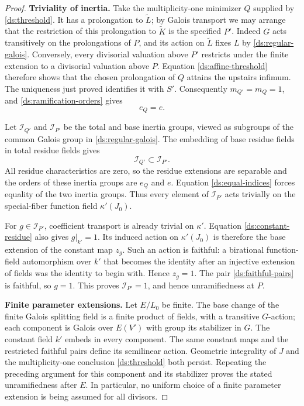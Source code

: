\begin{proof}
\smallskip\noindent\textbf{Triviality of inertia.}\enspace
Take the multiplicity-one minimizer $Q$ supplied by
\eqref{ds:threshold}.  It has a prolongation to $\widetilde L$;
by Galois transport we may arrange that the restriction of this
prolongation to $\widetilde K$ is the specified $P'$.  Indeed $G$
acts transitively on the prolongations of $P$, and its action on
$\widetilde L$ fixes $L$ by \eqref{ds:regular-galois}.
Conversely, every divisorial valuation above $P'$ restricts under
the finite extension to a divisorial valuation above $P$.
Equation \eqref{ds:affine-threshold} therefore shows that the
chosen prolongation of $Q$ attains the upstairs infimum.  The
uniqueness just proved identifies it with $S'$.  Consequently
$m_{Q'}=m_Q=1$, and \eqref{ds:ramification-orders} gives
\begin{equation}
 e_Q=e.
 \label{ds:equal-indices}
\end{equation}

Let $\mathcal I_{Q'}$ and $\mathcal I_{P'}$ be the total and base
inertia groups, viewed as subgroups of the common Galois group in
\eqref{ds:regular-galois}.  The embedding of base residue fields
in total residue fields gives
\[
 \mathcal I_{Q'}\subset\mathcal I_{P'}.
\]
All residue characteristics are zero, so the residue extensions
are separable and the orders of these inertia groups are $e_Q$
and $e$.  Equation \eqref{ds:equal-indices} forces equality of the
two inertia groups.  Thus every element of $\mathcal I_{P'}$ acts
trivially on the special-fiber function field $\kappa'(J_0)$.

For $g\in\mathcal I_{P'}$, coefficient transport is already
trivial on $\kappa'$.  Equation \eqref{ds:constant-residue} also
gives $g|_{k'}=1$.  Its induced action on $\kappa'(J_0)$ is
therefore the base extension of the constant map $z_g$.  Such an
action is faithful: a birational function-field automorphism over
$k'$ that becomes the identity after an injective extension of
fields was the identity to begin with.  Hence $z_g=1$.
The pair \eqref{ds:faithful-pairs} is faithful, so $g=1$.
This proves $\mathcal I_{P'}=1$, and hence unramifiedness at $P$.

\smallskip\noindent\textbf{Finite parameter extensions.}\enspace
Let $E/L_0$ be finite.  The base change of the finite
Galois splitting field is a finite product of fields, with a
transitive $G$-action; each component is Galois over $E(V')$ with
group its stabilizer in $G$.  The constant field $k'$ embeds in
every component.  The same constant maps and the restricted
faithful pairs define its semilinear action.  Geometric
integrality of $J$ and the multiplicity-one conclusion
\eqref{ds:threshold} both persist.  Repeating the preceding
argument for this component and its stabilizer proves the stated
unramifiedness after $E$.  In particular, no uniform choice of a
finite parameter extension is being assumed for all divisors.
\end{proof}

